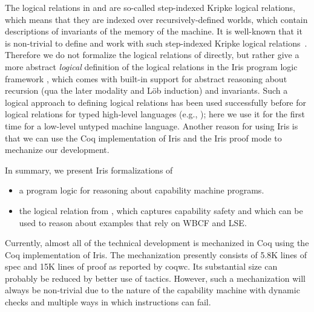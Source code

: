 \documentclass[sigplan,review]{acmart}\settopmatter{printfolios=true,printccs=false,printacmref=false}
\begin{document}
The logical relations in \cite{skorstengaardESOP18} and \cite{SkorstengaardPOPL19} are so-called step-indexed Kripke logical relations, which means that they are indexed over recursively-defined worlds, which contain descriptions of invariants of the memory of the machine.
It is well-known that it is non-trivial to define and work with such step-indexed Kripke logical relations~\cite{ahmed-2002, birkedal2011step}.
Therefore we do not formalize the logical relations of \citeauthor{skorstengaardESOP18} 
directly, but rather give a more abstract \emph{logical} definition of the logical relations in the Iris program logic framework \cite{iris,iris2,iris3, iris-jfp}, which comes with built-in support for abstract reasoning about recursion (qua the later modality and L{\"o}b induction) and invariants.
Such a logical approach to defining logical relations has been used successfully before for logical relations for typed high-level languages (e.g., \cite{lslr-journal,iris:type-effect,rustbelt,runst-popl18}); here we use it for the first time for a low-level untyped machine language.
Another reason for using Iris is that we can use the Coq implementation of Iris and
the Iris proof mode \cite{Krebbers:2017} to mechanize our development. 

In summary, we present Iris formalizations of 
\begin{itemize}
  \item a program logic for reasoning about capability machine programs.
  \item the logical relation from \cite{skorstengaardESOP18}, 
    which captures capability safety and which can be used to reason about examples
    that rely on WBCF and LSE.
\end{itemize}
Currently, almost all of the technical development is mechanized in Coq using the Coq implementation of Iris.
The mechanization presently consists of 5.8K lines of spec and 15K lines of proof as reported by \textsf{coqwc}.
Its substantial size can probably be reduced by better use of tactics. However, such a mechanization will always be non-trivial due to the nature of the capability machine with dynamic checks
and multiple ways in which instructions can fail.

\end{document}
